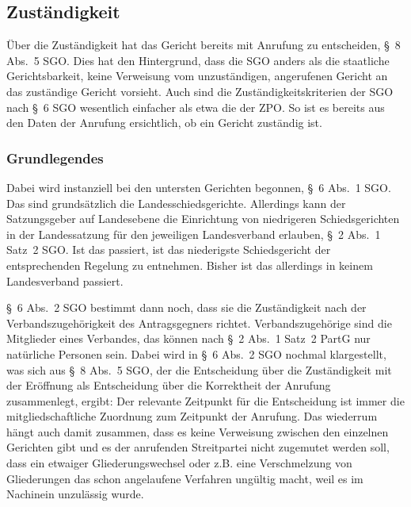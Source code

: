 \subsection{Zuständigkeit}
\label{Anrufung:Kriterien:Zustaendigkeit}
Über die Zuständigkeit hat das Gericht bereits mit Anrufung zu entscheiden, \S~8 Abs.~5 SGO.
Dies hat den Hintergrund, dass die SGO anders als die staatliche Gerichtsbarkeit, keine Verweisung vom unzuständigen, angerufenen Gericht an das zuständige Gericht vorsieht.
Auch sind die Zuständigkeitskriterien der SGO nach \S~6 SGO wesentlich einfacher als etwa die der ZPO.
So ist es bereits aus den Daten der Anrufung ersichtlich, ob ein Gericht zuständig ist.

\subsubsection{Grundlegendes}
\label{Anrufung:Kriterien:Zustaendigkeit:Grundlegendes}
Dabei wird instanziell bei den untersten Gerichten begonnen, \S~6 Abs.~1 SGO.
Das sind grundsätzlich die Landesschiedsgerichte.
Allerdings kann der Satzungsgeber auf Landesebene die Einrichtung von niedrigeren Schiedsgerichten in der Landessatzung für den jeweiligen Landesverband erlauben, \S~2 Abs.~1 Satz~2 SGO.
Ist das passiert, ist das niederigste Schiedsgericht der entsprechenden Regelung zu entnehmen.
Bisher ist das allerdings in keinem Landesverband passiert.

\S~6 Abs.~2 SGO bestimmt dann noch, dass sie die Zuständigkeit nach der Verbandszugehörigkeit des Antragsgegners richtet.
Verbandszugehörige sind die Mitglieder eines Verbandes, das können nach \S~2 Abs.~1 Satz~2 PartG nur natürliche Personen sein.
Dabei wird in \S~6 Abs.~2 SGO nochmal klargestellt, was sich aus \S~8 Abs.~5 SGO, der die Entscheidung über die Zuständigkeit mit der Eröffnung als Entscheidung über die Korrektheit der Anrufung zusammenlegt, ergibt: Der relevante Zeitpunkt für die Entscheidung ist immer die mitgliedschaftliche Zuordnung zum Zeitpunkt der Anrufung.
Das wiederrum hängt auch damit zusammen, dass es keine Verweisung zwischen den einzelnen Gerichten gibt und es der anrufenden Streitpartei nicht zugemutet werden soll, dass ein etwaiger Gliederungswechsel oder z.B. eine Verschmelzung von Gliederungen das schon angelaufene Verfahren ungültig macht, weil es im Nachinein unzulässig wurde.

